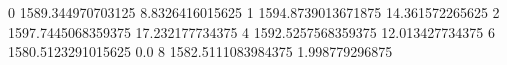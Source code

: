 0 1589.344970703125 8.8326416015625
1 1594.8739013671875 14.361572265625
2 1597.7445068359375 17.232177734375
4 1592.5257568359375 12.013427734375
6 1580.5123291015625 0.0
8 1582.5111083984375 1.998779296875
